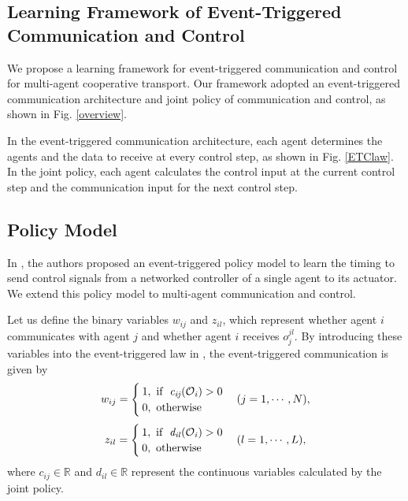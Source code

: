 \documentclass[letterpaper, 10 pt, conference]{ieeeconf} %
\begin{document}
\subsection{Learning Framework of Event-Triggered Communication and Control}
We propose a learning framework for event-triggered communication and control for multi-agent cooperative transport.
Our framework adopted an event-triggered communication architecture and joint policy of communication and control, as shown in Fig. \ref{overview}.

In the event-triggered communication architecture, each agent determines the agents and the data to receive at every control step, as shown in Fig. \ref{ETClaw}.
In the joint policy, each agent calculates the control input at the current control step and the communication input for the next control step.

\subsection{Policy Model}
In \cite{Baumann2018}, the authors proposed an event-triggered policy model to learn the timing to send control signals from a networked controller of a single agent to its actuator. We extend this policy model to multi-agent communication and control.

Let us define the binary variables $w_{ij}$ and $z_{il}$, which represent whether agent $i$ communicates with agent $j$ and whether agent $i$ receives $o_j^{jl}$.
By introducing these variables into the event-triggered law in \cite{Baumann2018}, the event-triggered communication is given by
\begin{eqnarray}
w_{ij}=
\begin{cases}
1, \ \rm{if \ } \> \it{}{c_{ij}}(\mathcal{O}_i)>\rm{0}\\
0, \ \rm{otherwise}\\
\end{cases}
(j=1,\cdots,N),
\label{ETCwho}
\end{eqnarray}
\begin{eqnarray}
z_{il}=
\begin{cases}
1, \ \rm{if \ } \> \it{}{d_{il}}(\mathcal{O}_i)>\rm{0}\\
0, \ \rm{otherwise}\\
\end{cases}
(l=1,\cdots,L),
\label{ETCwhat}
\end{eqnarray}
where $c_{ij}\in \mathbb{R}$ and $d_{il}\in \mathbb{R}$ represent the continuous variables calculated by the joint policy.
\end{document}
